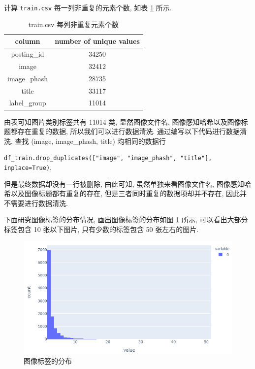 \documentclass[12pt]{article}
\begin{document}
计算 \verb|train.csv| 每一列非重复的元素个数, 如表 \ref{tab:unique_values} 所示. 

\begin{table}[htbp]
  \small
  \centering
  \caption{train.csv 每列非重复元素个数}
  \label{tab:unique_values}
  \begin{tabular}{cc}
    \toprule
    column & number of unique values \\
    \midrule
    posting\_id & 34250 \\
    image & 32412 \\
    image\_phash & 28735 \\
    title & 33117 \\
    label\_group & 11014 \\
    \bottomrule
  \end{tabular}
\end{table}

由表可知图片类别标签共有 11014 类, 显然图像文件名, 图像感知哈希以及图像标题都存在重复的数据, 所以我们可以进行数据清洗. 通过编写以下代码进行数据清洗, 查找 (image, image\_phash, title) 均相同的数据行 

\verb|df_train.drop_duplicates(["image", "image_phash", "title"], inplace=True)|, 

但是最终数据却没有一行被删除, 由此可知, 虽然单独来看图像文件名, 图像感知哈希以及图像标题都有重复的存在, 但是三者同时重复的数据项却并不存在, 因此并不需要进行数据清洗.

下面研究图像标签的分布情况, 画出图像标签的分布如图 \ref{fig:dist_label_group} 所示, 可以看出大部分标签包含 10 张以下图片, 只有少数的标签包含 50 张左右的图片.

\begin{figure}[htbp]
  \centering
  \includegraphics[width=12cm]{dist_label_group.png}
  \caption{图像标签的分布}
  \label{fig:dist_label_group}
\end{figure}
\end{document}
